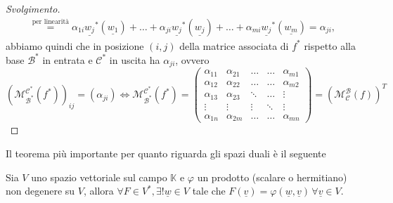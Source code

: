 \begin{proof}[Svolgimento]
\begin{align}
        &\stackrel{\text{per linearità}}{=} \alpha_{1i} \underline{w_j}^\ast(\underline{w_1}) + \ldots + \alpha_{ji} \underline{w_j}^\ast(\underline{w_j}) + \ldots + \alpha_{mi} \underline{w_j}^\ast(\underline{w_m}) = \alpha_{ji}, &
    \end{align}
    abbiamo quindi che in posizione $(i, j)$ della matrice associata di $f^\ast$ rispetto alla base $\mathcal{B}^\ast$ in entrata e $\mathcal{C}^\ast$ in uscita ha $\alpha_{ji}$, ovvero
    $$
        (\mathcal{M}^\mathcal{C^\ast}_\mathcal{B^\ast}(f^\ast))_{ij} = (\alpha_{ji}) \iff \mathcal{M}^\mathcal{C^\ast}_\mathcal{B^\ast}(f^\ast) = \begin{pmatrix}
            \alpha_{11} & \alpha_{21} & \ldots & \ldots & \alpha_{m1} \\
            \alpha_{12} & \alpha_{22} & \ldots & \ldots & \alpha_{m2} \\
            \alpha_{13} & \alpha_{23} & \ddots & \ldots & \vdots \\
            \vdots & \vdots & \vdots & \ddots & \vdots \\
            \alpha_{1n} & \alpha_{2m} & \ldots & \ldots & \alpha_{mn}
        \end{pmatrix} = (\mathcal{M}^\mathcal{B}_\mathcal{C}(f))^T
    $$
\end{proof}
Il teorema più importante per quanto riguarda gli spazi duali è il seguente
\begin{theorem}
    Sia $V$ uno spazio vettoriale sul campo $\mathbb{K}$ e $\varphi$ un prodotto (scalare o hermitiano) non degenere su $V$, allora $\forall F \in V^*, \exists ! \underline{w} \in V$ tale che $F(\underline{v}) = \varphi(\underline{w}, \underline{v}) \, \forall \underline{v} \in V$.
\end{theorem}
